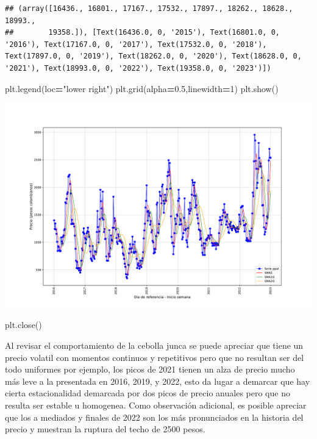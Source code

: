 \documentclass[
]{book}
\newenvironment{Shaded}{\begin{snugshade}}{\end{snugshade}}
\newcommand{\DecValTok}[1]{\textcolor[rgb]{0.00,0.00,0.81}{#1}}
\newcommand{\FloatTok}[1]{\textcolor[rgb]{0.00,0.00,0.81}{#1}}
\newcommand{\NormalTok}[1]{#1}
\newcommand{\OperatorTok}[1]{\textcolor[rgb]{0.81,0.36,0.00}{\textbf{#1}}}
\newcommand{\StringTok}[1]{\textcolor[rgb]{0.31,0.60,0.02}{#1}}
\begin{document}
\begin{verbatim}
## (array([16436., 16801., 17167., 17532., 17897., 18262., 18628., 18993.,
##        19358.]), [Text(16436.0, 0, '2015'), Text(16801.0, 0, '2016'), Text(17167.0, 0, '2017'), Text(17532.0, 0, '2018'), Text(17897.0, 0, '2019'), Text(18262.0, 0, '2020'), Text(18628.0, 0, '2021'), Text(18993.0, 0, '2022'), Text(19358.0, 0, '2023')])
\end{verbatim}

\begin{Shaded}
\begin{Highlighting}[]
\NormalTok{plt.legend(loc}\OperatorTok{=}\StringTok{"lower right"}\NormalTok{)}
\NormalTok{plt.grid(alpha}\OperatorTok{=}\FloatTok{0.5}\NormalTok{,linewidth}\OperatorTok{=}\DecValTok{1}\NormalTok{)}
\NormalTok{plt.show()}
\end{Highlighting}
\end{Shaded}

\includegraphics{bookdown-demo_files/figure-latex/unnamed-chunk-95-71.pdf}

\begin{Shaded}
\begin{Highlighting}[]
\NormalTok{plt.close()}
\end{Highlighting}
\end{Shaded}

Al revisar el comportamiento de la cebolla junca se puede apreciar que tiene un precio volatil con momentos continuos y repetitivos pero que no resultan ser del todo uniformes por ejemplo, los picos de 2021 tienen un alza de precio mucho más leve a la presentada en 2016, 2019, y 2022, esto da lugar a demarcar que hay cierta estacionalidad demarcada por dos picos de precio anuales pero que no resulta ser estable u homogenea. Como observación adicional, es posible apreciar que los a mediados y finales de 2022 son los más pronunciados en la historia del precio y muestran la ruptura del techo de 2500 pesos.
\end{document}
